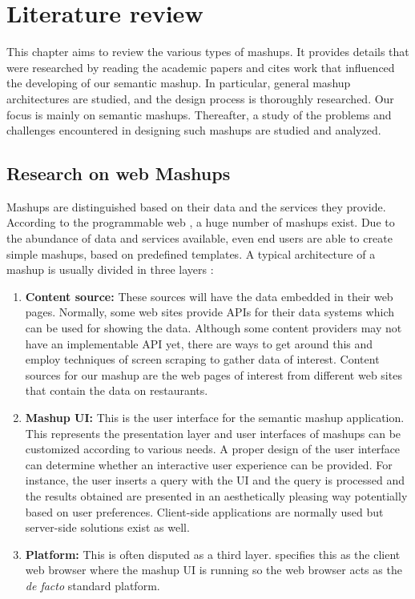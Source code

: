 \chapter{Literature review}
This chapter aims to review the various types of mashups. It provides details that were researched by reading the academic papers and cites work that influenced the developing of our semantic mashup. In particular, general mashup architectures are studied, and the design process is thoroughly researched. Our focus is mainly on semantic mashups. Thereafter, a study of the problems and challenges encountered in designing such mashups are studied and analyzed.

\section{Research on web Mashups}
Mashups are distinguished based on their data and the services they provide. According to the programmable web \cite{23}, a huge number of mashups exist. Due to the abundance of data and services available, even end users are able to create simple mashups, based on predefined templates. A typical architecture of a mashup is usually divided in three layers \cite{4}:
\begin{enumerate}
\item \textbf{Content source:} These sources will have the data embedded in their web pages. Normally, some web sites provide APIs for their data systems which can be used for showing the data. Although some content providers may not have an implementable API yet, there are ways to get around this and employ techniques of screen scraping to gather data of interest. Content sources for our mashup are the web pages of interest from different web sites that contain the data on restaurants.
\item \textbf{Mashup UI:} This is the user interface for the semantic mashup application. This represents the presentation layer and user interfaces of mashups can be customized according to various needs. A proper design of the user interface can determine whether an interactive user experience can be provided. For instance, the user inserts a query with the UI and the query is processed and the results obtained are presented in an aesthetically pleasing way potentially based on user preferences. Client-side applications are normally used but server-side solutions exist as well.
\item \textbf{Platform:} This is often disputed as a third layer. \cite{4} specifies this as the client web browser where the mashup UI is running so the web browser acts as the \textsl {de facto} standard platform.
\end{enumerate}

